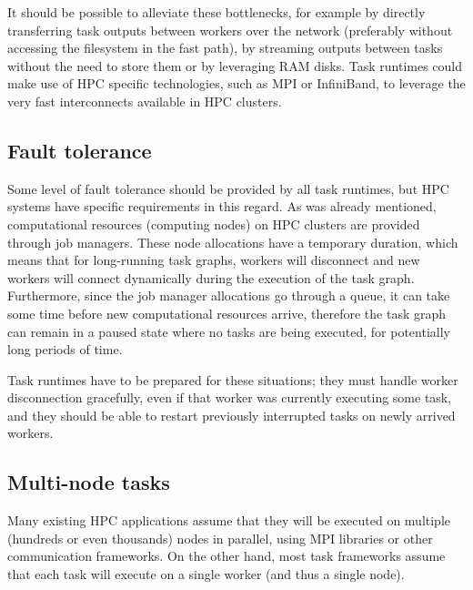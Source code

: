 It should be possible to alleviate these bottlenecks, for example by directly transferring task
outputs between workers over the network (preferably without accessing the filesystem in the
fast path), by streaming outputs between tasks without the need to store them or by leveraging
RAM disks. Task runtimes could make use of HPC specific technologies, such as MPI or InfiniBand,
to leverage the very fast interconnects available in HPC clusters.

\subsection{Fault tolerance}
Some level of fault tolerance should be provided by all task runtimes, but HPC systems have
specific requirements in this regard. As was already mentioned, computational resources
(computing nodes) on HPC clusters are provided through job managers. These node allocations have
a temporary duration, which means that for long-running task graphs, workers will disconnect and
new workers will connect dynamically during the execution of the task graph. Furthermore, since
the job manager allocations go through a queue, it can take some time before new computational
resources arrive, therefore the task graph can remain in a paused state where no tasks are being
executed, for potentially long periods of time.

Task runtimes have to be prepared for these situations; they must handle worker disconnection
gracefully, even if that worker was currently executing some task, and they should be able to
restart previously interrupted tasks on newly arrived workers.

\subsection{Multi-node tasks}
Many existing HPC applications assume that they will be executed on multiple (hundreds or even
thousands) nodes in parallel, using MPI libraries or other communication frameworks. On the
other hand, most task frameworks assume that each task will execute on a single worker (and thus
a single node).

